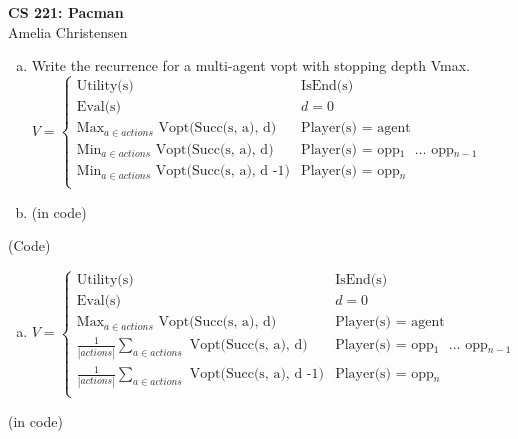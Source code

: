 \documentclass[11pt]{article}
\begin{document}
\begin{center}
{\bf CS 221: Pacman}\\
Amelia Christensen
\end{center}

\begin{enumerate}[(a)]
\item 
Write the recurrence for a multi-agent vopt with stopping depth Vmax.  \\

$V = \begin{cases} 
               \text{Utility(s)} & \text{IsEnd(s)}\\
               \text{Eval(s)} & d = 0\\
               \text{Max$_{a \in actions}$ Vopt(Succ(s, a), d)} & \text{Player(s) = agent} \\
               \text{Min$_{a \in actions}$ Vopt(Succ(s, a), d)} & \text{Player(s) = opp$_1$ $\hdots$  opp$_{n -1}$} \\
               \text{Min$_{a \in actions}$ Vopt(Succ(s, a), d -1)} & \text{Player(s) =  opp$_{n}$} \\
\end{cases} $

\item 
(in code)

\end{enumerate}

(Code)

\begin{enumerate}[(a)]
\item
$V = \begin{cases} 
               \text{Utility(s)} & \text{IsEnd(s)}\\
               \text{Eval(s)} & d = 0\\
               \text{Max$_{a \in actions}$ Vopt(Succ(s, a), d)} & \text{Player(s) = agent} \\
               \text{$\frac{1}{|actions|}\sum_{a \in actions}$ Vopt(Succ(s, a), d)} & \text{Player(s) = opp$_1$ $\hdots$  opp$_{n -1}$} \\
               \text{$\frac{1}{|actions|}\sum_{a \in actions}$ Vopt(Succ(s, a), d -1)} & \text{Player(s) =  opp$_{n}$} \\
\end{cases} $


\end{enumerate}

(in code)
\end{document}
